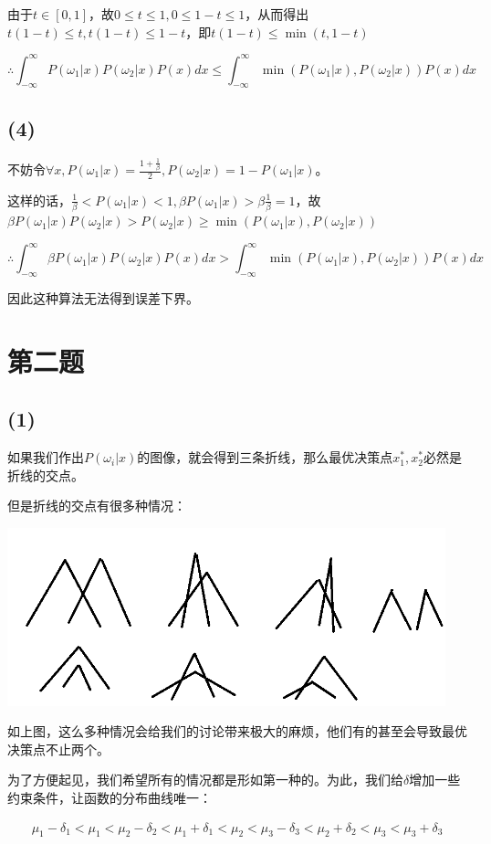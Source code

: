 \documentclass{ctexart}
\begin{document}
由于$t \in [0,1]$，故$0 \le t \le 1,0 \le 1-t \le 1$，从而得出$t(1-t) \le t,t(1-t) \le 1-t$，即$t(1-t) \le \min(t,1-t)$

\[\therefore \int_{-\infty}^{\infty}P(\omega_1|x)P(\omega_2|x)P(x)dx \le \int_{-\infty}^{\infty}\min(P(\omega_1|x),P(\omega_2|x))P(x)dx\]

\subsection*{(4)}
不妨令$\forall x,P(\omega_1|x)=\frac{1+\frac{1}{\beta}}{2},P(\omega_2|x)=1-P(\omega_1|x)$。

这样的话，$\frac{1}{\beta}<P(\omega_1|x)<1,\beta P(\omega_1|x)>\beta\frac{1}{\beta}=1$，故$\beta P(\omega_1|x)P(\omega_2|x)>P(\omega_2|x)\ge \min(P(\omega_1|x),P(\omega_2|x))$

\[\therefore \int_{-\infty}^{\infty}\beta P(\omega_1|x)P(\omega_2|x)P(x)dx > \int_{-\infty}^{\infty}\min(P(\omega_1|x),P(\omega_2|x))P(x)dx\]

因此这种算法无法得到误差下界。
\section*{第二题}
\subsection*{(1)}
如果我们作出$P(\omega_i|x)$的图像，就会得到三条折线，那么最优决策点$x_1^*,x_2^*$必然是折线的交点。

但是折线的交点有很多种情况：

\includegraphics[width=5in]{1.png}

如上图，这么多种情况会给我们的讨论带来极大的麻烦，他们有的甚至会导致最优决策点不止两个。

为了方便起见，我们希望所有的情况都是形如第一种的。为此，我们给$\delta$增加一些约束条件，让函数的分布曲线唯一：

\begin{align}
\mu_1-\delta_1<\mu_1<\mu_2-\delta_2<\mu_1+\delta_1<\mu_2<\mu_3-\delta_3<\mu_2+\delta_2<\mu_3<\mu_3+\delta_3
\end{align}
\end{document}
